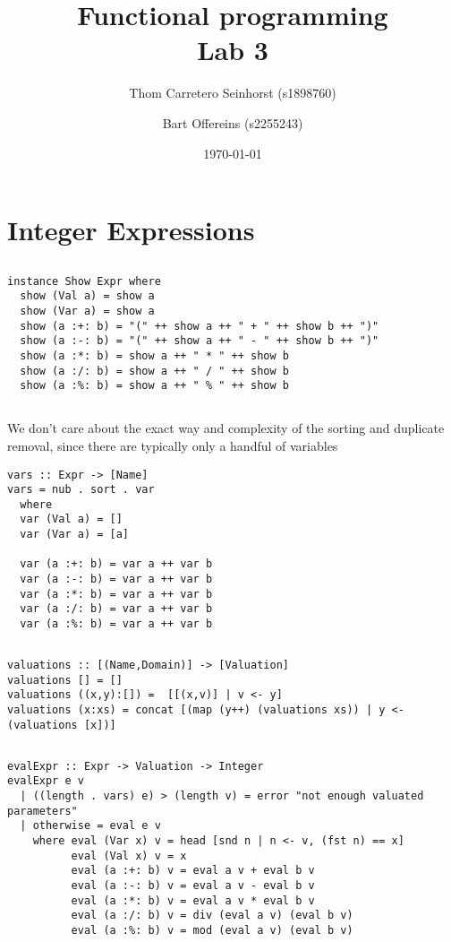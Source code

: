 \documentclass[a4paper,11pt]{article}
\author{Thom Carretero Seinhorst (s1898760) \and Bart Offereins (s2255243)}
\date{\today}
\title{Functional programming \\Lab 3}
\begin{document}
  \maketitle

\section{Integer Expressions}

\subsection{}
\begin{lstlisting}
instance Show Expr where
  show (Val a) = show a
  show (Var a) = show a
  show (a :+: b) = "(" ++ show a ++ " + " ++ show b ++ ")"
  show (a :-: b) = "(" ++ show a ++ " - " ++ show b ++ ")"
  show (a :*: b) = show a ++ " * " ++ show b
  show (a :/: b) = show a ++ " / " ++ show b
  show (a :%: b) = show a ++ " % " ++ show b
\end{lstlisting}

\subsection{}
We don't care about the exact way and complexity of the sorting and duplicate removal, since there are typically only a handful of variables

\begin{lstlisting}
vars :: Expr -> [Name]
vars = nub . sort . var
  where
  var (Val a) = []
  var (Var a) = [a]

  var (a :+: b) = var a ++ var b
  var (a :-: b) = var a ++ var b
  var (a :*: b) = var a ++ var b
  var (a :/: b) = var a ++ var b
  var (a :%: b) = var a ++ var b
\end{lstlisting}

\subsection{}
\begin{lstlisting}
valuations :: [(Name,Domain)] -> [Valuation]
valuations [] = []
valuations ((x,y):[]) =  [[(x,v)] | v <- y]
valuations (x:xs) = concat [(map (y++) (valuations xs)) | y <- (valuations [x])]
\end{lstlisting}

\subsection{}
\begin{lstlisting}
evalExpr :: Expr -> Valuation -> Integer
evalExpr e v
  | ((length . vars) e) > (length v) = error "not enough valuated parameters"
  | otherwise = eval e v
    where eval (Var x) v = head [snd n | n <- v, (fst n) == x] 
          eval (Val x) v = x
          eval (a :+: b) v = eval a v + eval b v
          eval (a :-: b) v = eval a v - eval b v
          eval (a :*: b) v = eval a v * eval b v
          eval (a :/: b) v = div (eval a v) (eval b v)
          eval (a :%: b) v = mod (eval a v) (eval b v)
\end{lstlisting}
\end{document}
